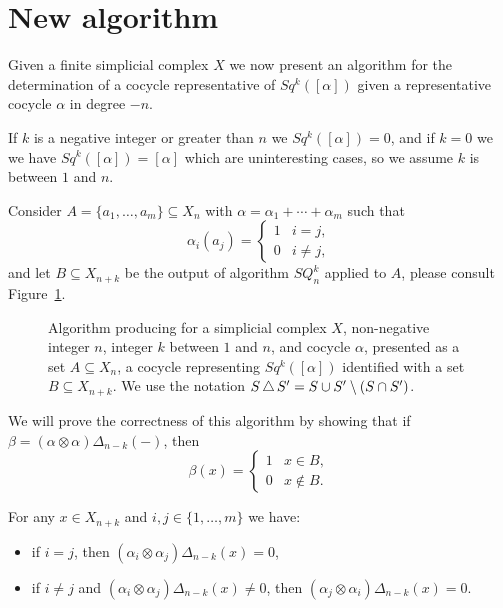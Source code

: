 
\section{New algorithm}

Given a finite simplicial complex $X$ we now present an algorithm for the determination of a cocycle representative of $Sq^k([\alpha])$ given a representative cocycle $\alpha$ in degree $-n$.

If $k$ is a negative integer or greater than $n$ we $Sq^k([\alpha]) = 0$, and if $k = 0$ we we have $Sq^k([\alpha]) = [\alpha]$ which are uninteresting cases, so we assume $k$ is between $1$ and $n$.

Consider $A = \{a_1, \dots, a_m\} \subseteq X_n$ with $\alpha = \alpha_1 + \cdots + \alpha_m$ such that
\begin{equation*}
\alpha_i(a_j) = \begin{cases}
1 & i=j, \\ 0 & i\neq j,
\end{cases}
\end{equation*}
and let $B \subseteq X_{n+k}$ be the output of algorithm $SQ_n^k$ applied to $A$, please consult Figure~\ref{f:algorithm}.
\begin{figure}[h]
	
	\caption{Algorithm producing for a simplicial complex $X$, non-negative integer $n$, integer $k$ between $1$ and $n$, and cocycle $\alpha$, presented as a set $A \subseteq X_n$, a cocycle representing $Sq^k([\alpha])$ identified with a set $B \subseteq X_{n+k}$.
		We use the notation $S \operatorname{\triangle} S^\prime = S \cup S^\prime \setminus (S \cap S^\prime)$.}
	\label{f:algorithm}
\end{figure}
We will prove the correctness of this algorithm by showing that if $\beta = (\alpha \otimes \alpha)\Delta_{n-k}(-)$, then
\begin{equation*}
\beta(x) =
\begin{cases}
1 & x \in B, \\
0 & x \not\in B.
\end{cases}
\end{equation*}

\begin{lemma} \label{l:freeness}
	For any $x \in X_{n+k}$ and $i,j \in \{1,\dots,m\}$ we have:
	\begin{itemize}
		\item if $i=j$, then $(\alpha_i \otimes \alpha_j)\Delta_{n-k}(x) = 0$,
		\item if $i \neq j$ and $(\alpha_i \otimes \alpha_j)\Delta_{n-k}(x) \neq 0$, then $(\alpha_j \otimes \alpha_i)\Delta_{n-k}(x) = 0$.
	\end{itemize}
\end{lemma}

